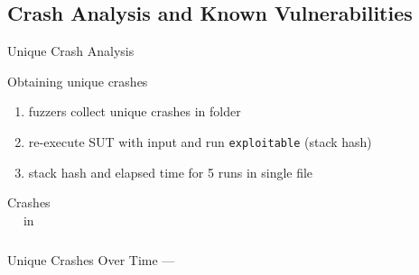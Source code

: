 \documentclass[\HandoutMode,table]{beamer}
\newcommand\figwidth\textwidth
\begin{document}
\subsection{Crash Analysis and Known Vulnerabilities}

\begin{frame}{Unique Crash Analysis}
    \begin{block}{Obtaining unique crashes}
        \begin{enumerate}
            \item{} fuzzers collect unique crashes in folder
            \item{} re-execute SUT with input and run \texttt{exploitable} (stack hash)
            \item{} stack hash and elapsed time for 5 runs in single file
        \end{enumerate}
    \end{block}
    \vspace{\baselineskip}
    \begin{table}
        \begin{tabular}{l c c c c}
            
        \end{tabular}
        \caption{Crashes in \listswf}
    \end{table}
\end{frame}

\begin{frame}{Unique Crashes Over Time --- \listswf}
    \renewcommand\figwidth{.32\textwidth}
    \setcounter{subfigure}{0}
    \captionsetup[subfigure]{margin=3pt}
    \begin{figure}
    \end{figure}
\end{frame}
\end{document}
